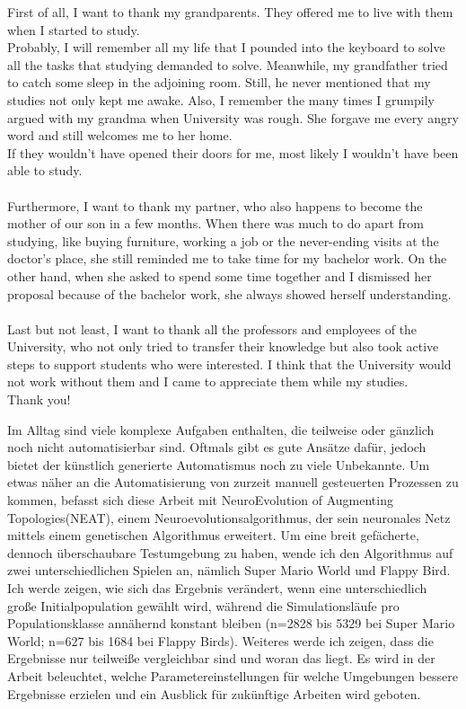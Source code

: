 \documentclass[draft,final]{vutinfth} %
\begin{document}
\begin{acknowledgements*}
First of all, I want to thank my grandparents. They offered me to live with them when I started to study.\\
Probably, I will remember all my life that I pounded into the keyboard to solve all the tasks that studying demanded to solve. Meanwhile, my grandfather tried to catch some sleep in the adjoining room. Still, he never mentioned that my studies not only kept me awake. Also, I remember the many times I grumpily argued with my grandma when University was rough. She forgave me every angry word and still welcomes me to her home.\\
If they wouldn't have opened their doors for me, most likely I wouldn't have been able to study.\\
\\
Furthermore, I want to thank my partner, who also happens to become the mother of our son in a few months. When there was much to do apart from studying, like buying furniture, working a job or the never-ending visits at the doctor's place, she still reminded me to take time for my bachelor work. On the other hand, when she asked to spend some time together and I dismissed her proposal because of the bachelor work, she always showed herself understanding.\\
\\
Last but not least, I want to thank all the professors and employees of the University, who not only tried to transfer their knowledge but also took active steps to support students who were interested. I think that the University would not work without them and I came to appreciate them while my studies.\\
Thank you!
\end{acknowledgements*}

\begin{kurzfassung}
Im Alltag sind viele komplexe Aufgaben enthalten, die teilweise oder gänzlich noch nicht automatisierbar sind. Oftmals gibt es gute Ansätze dafür, jedoch bietet der künstlich generierte Automatismus noch zu viele Unbekannte. Um etwas näher an die Automatisierung von zurzeit manuell gesteuerten Prozessen zu kommen, befasst sich diese Arbeit mit NeuroEvolution of Augmenting Topologies(NEAT), einem Neuroevolutionsalgorithmus, der sein neuronales Netz mittels einem genetischen Algorithmus erweitert. Um eine breit gefächerte, dennoch überschaubare Testumgebung zu haben, wende ich den Algorithmus auf zwei unterschiedlichen Spielen an, nämlich Super Mario World und Flappy Bird. Ich werde zeigen, wie sich das Ergebnis verändert, wenn eine unterschiedlich große Initialpopulation gewählt wird, während die Simulationsläufe pro Populationsklasse annähernd konstant bleiben (n=2828 bis 5329 bei Super Mario World; n=627 bis 1684 bei Flappy Birds). Weiteres werde ich zeigen, dass die Ergebnisse nur teilweiße vergleichbar sind und woran das liegt. Es wird in der Arbeit beleuchtet, welche Parametereinstellungen für welche Umgebungen bessere Ergebnisse erzielen und ein Ausblick für zukünftige Arbeiten wird geboten.
\end{kurzfassung}
\end{document}
